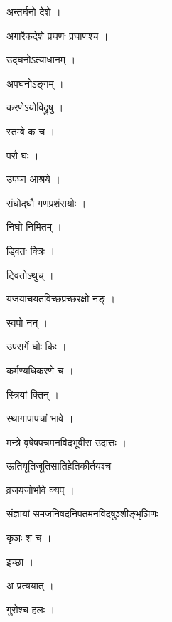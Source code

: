 \documentclass[10pt, openany]{book}
\begin{document}
\noindent अन्तर्घनो देशे ।

\noindent अगारैकदेशे प्रघणः प्रघाणश्च ।

\noindent उद्घनोऽत्याधानम् ।

\noindent अपघनोऽङ्गम् ।

\noindent करणेऽयोविद्रुषु ।

\noindent स्तम्बे क च ।

\noindent परौ घः ।

\noindent उपघ्न आश्रये ।

\noindent संघोद्घौ गणप्रशंसयोः ।

\noindent निघो निमितम् ।

\noindent ड्वितः क्त्रिः ।

\noindent ट्वितोऽथुच् ।

\noindent यजयाचयतविच्छप्रच्छरक्षो नङ् ।

\noindent स्वपो नन् ।

\noindent उपसर्गे घोः किः ।

\noindent कर्मण्यधिकरणे च ।

\noindent स्त्रियां क्तिन् ।

\noindent स्थागापापचां भावे ।

\noindent मन्त्रे वृषेषपचमनविदभूवीरा उदात्तः ।

\noindent ऊतियूतिजूतिसातिहेतिकीर्तयश्च ।

\noindent व्रजयजोर्भावे क्यप् ।

\noindent संज्ञायां समजनिषदनिपतमनविदषुञ्शीङ्भृञिणः ।

\noindent कृञः श च ।

\noindent इच्छा ।

\noindent अ प्रत्ययात् ।

\noindent गुरोश्च हलः ।
\end{document}
